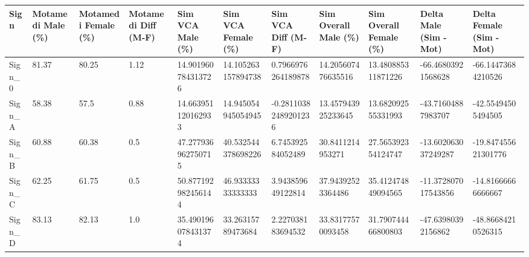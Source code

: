 \begin{tabular}{lllllllllll}
\hline
Sign & Motamedi Male (\%) & Motamedi Female (\%) & Motamedi Diff (M-F) & Sim VCA Male (\%) & Sim VCA Female (\%) & Sim VCA Diff (M-F) & Sim Overall Male (\%) & Sim Overall Female (\%) & Delta Male (Sim - Mot) & Delta Female (Sim - Mot) \\ \hline
Sign\_0 & 81.37 & 80.25 & 1.12 & 14.901960784313726 & 14.105263157894738 & 0.7966976264189878 & 14.205607476635516 & 13.480885311871226 & -66.46803921568628 & -66.14473684210526 \\
Sign\_A & 58.38 & 57.5 & 0.88 & 14.663951120162933 & 14.945054945054945 & -0.28110382489201236 & 13.457943925233645 & 13.682092555331993 & -43.71604887983707 & -42.55494505494505 \\
Sign\_B & 60.88 & 60.38 & 0.5 & 47.277936962750715 & 40.532544378698226 & 6.745392584052489 & 30.8411214953271 & 27.565392354124747 & -13.602063037249287 & -19.847455621301776 \\
Sign\_C & 62.25 & 61.75 & 0.5 & 50.877192982456144 & 46.93333333333333 & 3.943859649122814 & 37.94392523364486 & 35.412474849094565 & -11.372807017543856 & -14.81666666666667 \\
Sign\_D & 83.13 & 82.13 & 1.0 & 35.490196078431374 & 33.26315789473684 & 2.227038183694532 & 33.83177570093458 & 31.790744466800803 & -47.63980392156862 & -48.86684210526315 \\
\hline
\end{tabular}
